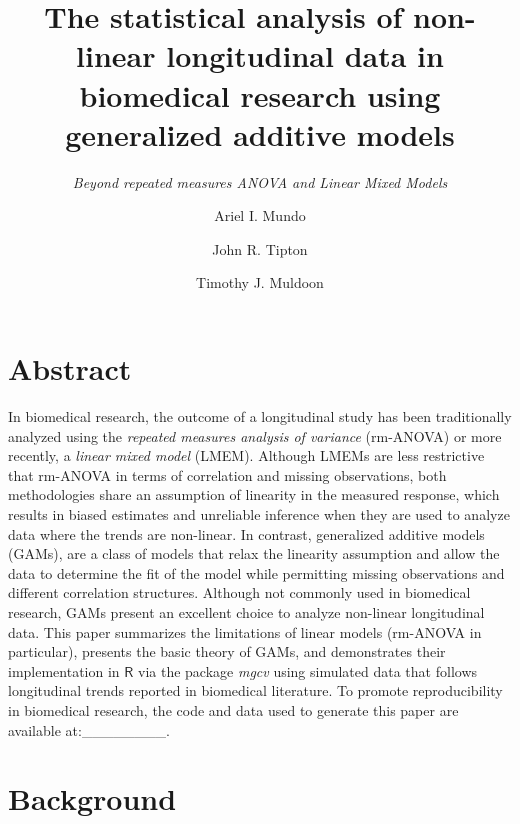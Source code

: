 \documentclass[
]{article}
\author[1]{Ariel I. Mundo}
\author[2]{John R. Tipton}
\author[1]{Timothy J. Muldoon}
\affil[1]{\footnotesize Department of Biomedical Engineering, University of Arkansas, Fayetteville, AR, USA}
\affil[2]{\footnotesize Department of Mathematical Sciences, University of Arkansas, Fayetteville, AR, USA}
\title{\textbf{The statistical analysis of non-linear longitudinal data in biomedical research using generalized additive models}}
\subtitle{\emph{Beyond repeated measures ANOVA and Linear Mixed Models}}
\author{}
\date{\vspace{-2.5em}}
\begin{document}
\maketitle

{
\setcounter{tocdepth}{2}
\tableofcontents
}
\hypertarget{abstract}{%
\section{Abstract}\label{abstract}}

In biomedical research, the outcome of a longitudinal study has been traditionally analyzed using the \emph{repeated measures analysis of variance} (rm-ANOVA) or more recently, a \emph{linear mixed model} (LMEM). Although LMEMs are less restrictive that rm-ANOVA in terms of correlation and missing observations, both methodologies share an assumption of linearity in the measured response, which results in biased estimates and unreliable inference when they are used to analyze data where the trends are non-linear. In contrast, generalized additive models (GAMs), are a class of models that relax the linearity assumption and allow the data to determine the fit of the model while permitting missing observations and different correlation structures. Although not commonly used in biomedical research, GAMs present an excellent choice to analyze non-linear longitudinal data. This paper summarizes the limitations of linear models (rm-ANOVA in particular), presents the basic theory of GAMs, and demonstrates their implementation in \(\textsf{R}\) via the package \emph{mgcv} using simulated data that follows longitudinal trends reported in biomedical literature. To promote reproducibility in biomedical research, the code and data used to generate this paper are available at:\_\_\_\_\_\_\_\_.

\hypertarget{background}{%
\section{Background}\label{background}}
\end{document}
